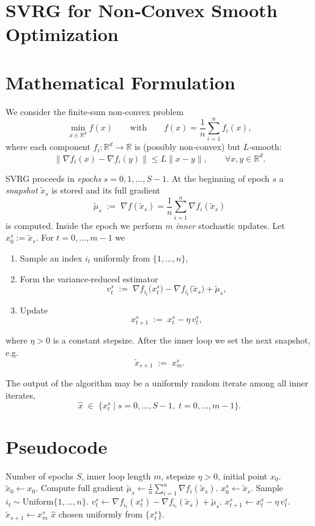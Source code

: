 \documentclass[11pt]{article}
\newcommand{\R}{\mathbb{R}}
\begin{document}
\section*{SVRG for Non‑Convex Smooth Optimization}

\section*{Mathematical Formulation}
We consider the finite‑sum non‑convex problem  
\[
\min_{x\in\R^{d}} f(x)\qquad\text{with}\qquad 
f(x)=\frac1n\sum_{i=1}^{n}f_i(x),
\]
where each component $f_i:\R^{d}\to\R$ is (possibly non‑convex) but $L$‑smooth:
\[
\|\nabla f_i(x)-\nabla f_i(y)\|\le L\|x-y\|,\qquad\forall x,y\in\R^{d}. \tag{1}
\]

SVRG proceeds in \emph{epochs} $s=0,1,\dots,S-1$.  
At the beginning of epoch $s$ a \emph{snapshot} $\tilde{x}_s$ is stored and its full gradient
\[
\tilde{\mu}_s\;:=\;\nabla f(\tilde{x}_s)=\frac1n\sum_{i=1}^{n}\nabla f_i(\tilde{x}_s)
\tag{2}
\]
is computed.  
Inside the epoch we perform $m$ \emph{inner} stochastic updates.  Let $x^{s}_0:=\tilde{x}_s$.  For $t=0,\dots,m-1$ we

\begin{enumerate}[label=\arabic*.]
\item Sample an index $i_t$ uniformly from $\{1,\dots,n\}$,
\item Form the variance‑reduced estimator
\[
v^{s}_t\;:=\;\nabla f_{i_t}\!\bigl(x^{s}_t\bigr)-\nabla f_{i_t}\!\bigl(\tilde{x}_s\bigr)+\tilde{\mu}_s,
\tag{3}
\]
\item Update
\[
x^{s}_{t+1}\;:=\;x^{s}_t-\eta\,v^{s}_t,
\tag{4}
\]
\end{enumerate}
where $\eta>0$ is a constant stepsize.  After the inner loop we set the next snapshot, e.g.
\[
\tilde{x}_{s+1}\;:=\;x^{s}_m .
\tag{5}
\]

The output of the algorithm may be a uniformly random iterate among all inner iterates,
\[
\hat{x}\;\in\;\{x^{s}_t\mid s=0,\dots,S-1,\;t=0,\dots,m-1\}.
\]

\section*{Pseudocode}
\begin{algorithm}[H]
\caption{SVRG (non‑convex, $L$‑smooth)}\label{alg:svrg}
\begin{algorithmic}[1]
\Require Number of epochs $S$, inner loop length $m$, stepsize $\eta>0$, initial point $x_0$.
\State $\tilde{x}_0\gets x_0$.
    \State Compute full gradient $\tilde{\mu}_s\gets \frac1n\sum_{i=1}^n\nabla f_i(\tilde{x}_s)$.
    \State $x^{s}_0\gets \tilde{x}_s$.
        \State Sample $i_t\sim\text{Uniform}\{1,\dots,n\}$.
        \State $v^{s}_t\gets \nabla f_{i_t}(x^{s}_t)-\nabla f_{i_t}(\tilde{x}_s)+\tilde{\mu}_s$.
        \State $x^{s}_{t+1}\gets x^{s}_t-\eta\,v^{s}_t$.
    \EndFor
    \State $\tilde{x}_{s+1}\gets x^{s}_m$   
\EndFor
\State \Return $\hat{x}$ chosen uniformly from $\{x^{s}_t\}$.
\end{algorithmic}
\end{algorithm}
\end{document}

